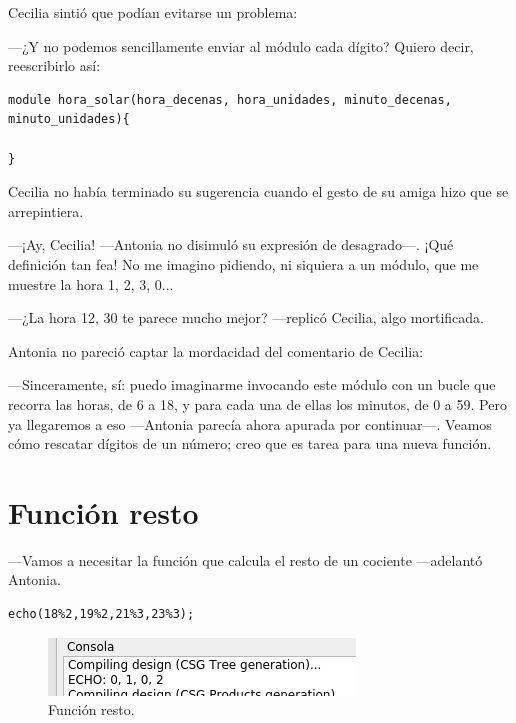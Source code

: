 
Cecilia sintió que podían evitarse un problema:

---¿Y no podemos sencillamente enviar al módulo cada dígito? Quiero
decir, reescribirlo así:

\begin{lstlisting}
module hora_solar(hora_decenas, hora_unidades, minuto_decenas, minuto_unidades){

}  
\end{lstlisting}


Cecilia no había terminado su sugerencia cuando el gesto de su amiga
hizo que se arrepintiera.

---¡Ay, Cecilia!  ---Antonia no disimuló su expresión de
de\-sa\-gra\-do---. ¡Qué definición tan fea!  No me imagino pidiendo,
ni siquiera a un módulo, que me muestre la hora 1, 2, 3, 0...

---¿La hora 12, 30 te parece mucho mejor? ---replicó Cecilia, algo
mortificada.

Antonia no pareció captar la mordacidad del comentario de Cecilia:

---Sinceramente, sí: puedo imaginarme invocando este módulo con un
bucle que recorra las horas, de 6 a 18, y para cada una de ellas los
minutos, de 0 a 59. Pero ya llegaremos a eso ---Antonia parecía ahora
apurada por continuar---. Veamos cómo rescatar dígitos de un número;
creo que es tarea para una nueva función.

\section{Función resto}
                                
---Vamos a necesitar la función que calcula el resto de un cociente
---adelantó Antonia.

\begin{lstlisting}[numbers=none]
echo(18%2,19%2,21%3,23%3);
\end{lstlisting}

\begin{figure}[ht]
  \centering
\includegraphics[width=.75\textwidth]{imagenes/restos-2-y-3}  
  \caption{Función resto.}
  \label{fig:restos-2-y-3}
\end{figure}


